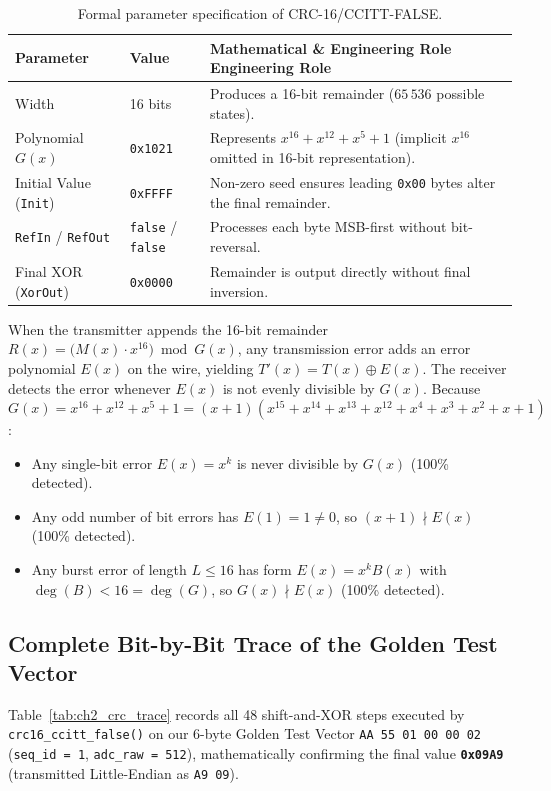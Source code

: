 \documentclass[11pt,a4paper,oneside]{report}
\begin{document}
\begin{table}[!htbp]
\centering
\caption{Formal parameter specification of CRC-16/CCITT-FALSE.}
\label{tab:ch2_crc_params}
\begin{tabularx}{\linewidth}{l l X}
\toprule
\textbf{Parameter} & \textbf{Value} & \textbf{Mathematical \& Engineering Role Engineering Role} \\
\midrule
Width & 16 bits & Produces a 16-bit remainder ($65\,536$ possible states). \\
Polynomial $G(x)$ & \texttt{0x1021} & Represents $x^{16} + x^{12} + x^5 + 1$ (implicit $x^{16}$ omitted in 16-bit representation). \\
Initial Value (\texttt{Init}) & \texttt{0xFFFF} & Non-zero seed ensures leading \texttt{0x00} bytes alter the final remainder. \\
\texttt{RefIn} / \texttt{RefOut} & \texttt{false} / \texttt{false} & Processes each byte MSB-first without bit-reversal. \\
Final XOR (\texttt{XorOut}) & \texttt{0x0000} & Remainder is output directly without final inversion. \\
\bottomrule
\end{tabularx}
\end{table}

When the transmitter appends the 16-bit remainder $R(x) = \bigl(M(x)\cdot x^{16}\bigr) \bmod G(x)$, any transmission error adds an error polynomial $E(x)$ on the wire, yielding $T'(x) = T(x) \oplus E(x)$. The receiver detects the error whenever $E(x)$ is not evenly divisible by $G(x)$. Because $G(x) = x^{16} + x^{12} + x^5 + 1 = (x+1)(x^{15}+x^{14}+x^{13}+x^{12}+x^4+x^3+x^2+x+1)$:
\begin{itemize}
\item Any single-bit error $E(x) = x^k$ is never divisible by $G(x)$ (100\% detected).
\item Any odd number of bit errors has $E(1) = 1 \neq 0$, so $(x+1) \nmid E(x)$ (100\% detected).
\item Any burst error of length $L \le 16$ has form $E(x) = x^k B(x)$ with $\deg(B) < 16 = \deg(G)$, so $G(x) \nmid E(x)$ (100\% detected).
\end{itemize}

\subsection{Complete Bit-by-Bit Trace of the Golden Test Vector}

Table~\ref{tab:ch2_crc_trace} records all 48 shift-and-XOR steps executed by \texttt{crc16\_ccitt\_false()} on our 6-byte Golden Test Vector \texttt{AA 55 01 00 00 02} (\texttt{seq\_id = 1}, \texttt{adc\_raw = 512}), mathematically confirming the final value \textbf{\texttt{0x09A9}} (transmitted Little-Endian as \texttt{A9 09}).
\end{document}
